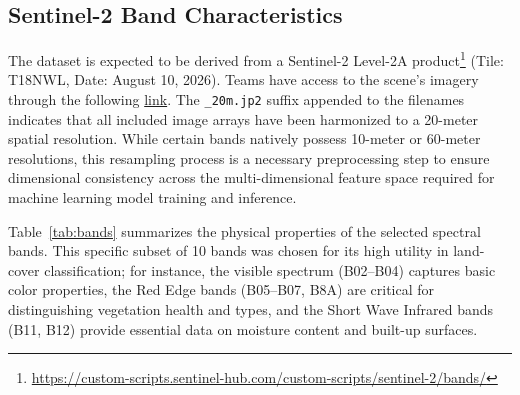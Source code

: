 \documentclass{article}
\begin{document}
\subsection{Sentinel-2 Band Characteristics}

The dataset is expected to be derived from a Sentinel-2 Level-2A product\footnote{\url{https://custom-scripts.sentinel-hub.com/custom-scripts/sentinel-2/bands/}} (Tile: T18NWL, Date: August 10, 2026). Teams have access to the scene's imagery through the following \href{https://drive.google.com/drive/folders/1PcY6xgIXweaTyFkotvhcjVsLUVlv5oAY?usp=sharing}{link}.  The \texttt{\_20m.jp2} suffix appended to the filenames indicates that all included image arrays have been harmonized to a 20-meter spatial resolution. While certain bands natively possess 10-meter or 60-meter resolutions, this resampling process is a necessary preprocessing step to ensure dimensional consistency across the multi-dimensional feature space required for machine learning model training and inference.

Table~\ref{tab:bands} summarizes the physical properties of the selected spectral bands. This specific subset of 10 bands was chosen for its high utility in land-cover classification; for instance, the visible spectrum (B02--B04) captures basic color properties, the Red Edge bands (B05--B07, B8A) are critical for distinguishing vegetation health and types, and the Short Wave Infrared bands (B11, B12) provide essential data on moisture content and built-up surfaces.
\end{document}
